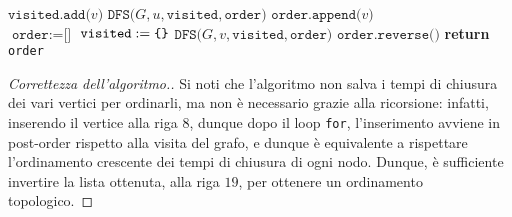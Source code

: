 \documentclass[a4paper, 12pt]{report}
\begin{document}
    \begin{algorithm}[H]
        \caption{
            Dato un grafo diretto aciclico connesso $G$, rappresentato attraverso liste di adiacenza in cui vengono salvati gli archi adiacenti uscenti, l'algoritmo restituisce un ordinamento topologico di $G$.\\
            \textbf{Input}: $G$ grafo diretto, rappresentato attraverso liste di adiacenza.\\
            \textbf{Output}: un ordinamento topologico di $G$.
        }

        \begin{algorithmic}[1]
                \State $\texttt{visited.add(}v\texttt{)}$
                 
                        \State $\texttt{DFS(}G, u, \texttt{visited},\texttt{order)}$
                    \EndIf
                \EndFor
                \State $\texttt{order.append(}v\texttt{)}$ 
            \EndFunction
            \\
                \State $\texttt{order} := \texttt{[]}$
                \State $\texttt{visited} := \verb|{|\verb|}|$
                        \State $\texttt{DFS(}G, v, \texttt{visited},\texttt{order)}$
                    \EndIf
                \EndFor
                \State $\texttt{order.reverse()}$ 
                \State \textbf{return} \texttt{order}
            \EndFunction
        \end{algorithmic}
    \end{algorithm}

    \begin{proof}[Correttezza dell'algoritmo.]
        Si noti che l'algoritmo non salva i tempi di chiusura dei vari vertici per ordinarli, ma non è necessario grazie alla ricorsione: infatti, inserendo il vertice alla riga $8$, dunque dopo il loop \texttt{for}, l'inserimento avviene in post-order rispetto alla visita del grafo, e dunque è equivalente a rispettare l'ordinamento crescente dei tempi di chiusura di ogni nodo. Dunque, è sufficiente invertire la lista ottenuta, alla riga $19$, per ottenere un ordinamento topologico.
    \end{proof}
\end{document}
